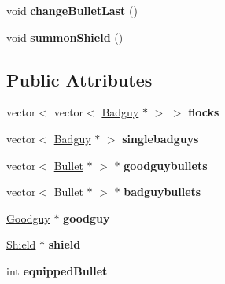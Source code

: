 \begin{DoxyCompactItemize}
\item 
\hypertarget{classLevelDesigner_aa84fd01ed5e2aee660f7340499a15321}{void {\bfseries change\-Bullet\-Last} ()}\label{classLevelDesigner_aa84fd01ed5e2aee660f7340499a15321}

\item 
\hypertarget{classLevelDesigner_a07c2f585a574d7503c4a9ae0ef32ff42}{void {\bfseries summon\-Shield} ()}\label{classLevelDesigner_a07c2f585a574d7503c4a9ae0ef32ff42}

\end{DoxyCompactItemize}
\subsection*{Public Attributes}
\begin{DoxyCompactItemize}
\item 
\hypertarget{classLevelDesigner_aee4ceb6be7067f90b9cb8a53efd7035f}{vector$<$ vector$<$ \hyperlink{classBadguy}{Badguy} $\ast$ $>$ $>$ {\bfseries flocks}}\label{classLevelDesigner_aee4ceb6be7067f90b9cb8a53efd7035f}

\item 
\hypertarget{classLevelDesigner_a7c13895dddd327a52ff90b79ba8217f8}{vector$<$ \hyperlink{classBadguy}{Badguy} $\ast$ $>$ {\bfseries singlebadguys}}\label{classLevelDesigner_a7c13895dddd327a52ff90b79ba8217f8}

\item 
\hypertarget{classLevelDesigner_ad93fe4d7366aed29fc04c6f4812bc5c1}{vector$<$ \hyperlink{classBullet}{Bullet} $\ast$ $>$ $\ast$ {\bfseries goodguybullets}}\label{classLevelDesigner_ad93fe4d7366aed29fc04c6f4812bc5c1}

\item 
\hypertarget{classLevelDesigner_affd375534ccdbf5e561de2f74b3af5de}{vector$<$ \hyperlink{classBullet}{Bullet} $\ast$ $>$ $\ast$ {\bfseries badguybullets}}\label{classLevelDesigner_affd375534ccdbf5e561de2f74b3af5de}

\item 
\hypertarget{classLevelDesigner_a57c53bb70aa4c6c331c4d5e3fdd692f5}{\hyperlink{classGoodguy}{Goodguy} $\ast$ {\bfseries goodguy}}\label{classLevelDesigner_a57c53bb70aa4c6c331c4d5e3fdd692f5}

\item 
\hypertarget{classLevelDesigner_ad5a493173f042876f861a2f5de9a6c1d}{\hyperlink{classShield}{Shield} $\ast$ {\bfseries shield}}\label{classLevelDesigner_ad5a493173f042876f861a2f5de9a6c1d}

\item 
\hypertarget{classLevelDesigner_a23427ceb24badc557f3e1891b5e11496}{int {\bfseries equipped\-Bullet}}\label{classLevelDesigner_a23427ceb24badc557f3e1891b5e11496}


\end{DoxyCompactItemize}
